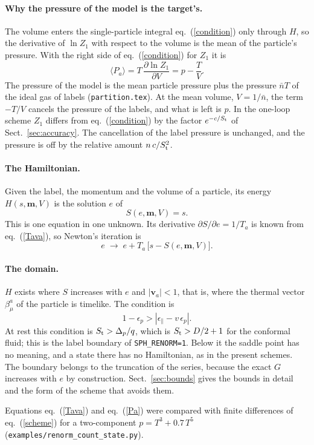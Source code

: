 \documentclass[11pt,aps,preprint,nofootinbib,superscriptaddress,tightenlines]{revtex4-2}
\newcommand{\avg}[1]{\langle #1\rangle}
\def\st{\begin{equation}}
\def\stp{\end{equation}}
\def\Eq#1{eq.~(\ref{#1})}
\def\Sect#1{Sect.~\ref{#1}}
\let\oldparagraph\paragraph
\renewcommand{\paragraph}{\par\bigskip\oldparagraph}
\begin{document}
\paragraph{Why the pressure of the model is the target's.}  The volume enters the single-particle integral \Eq{condition} only through $H$, so the
derivative of $\ln Z_1$ with respect to the volume is the mean of the particle's pressure.  With the right side of \Eq{condition} for $Z_1$ it is
\st
\avg{P_a}=T\,\frac{\partial\ln Z_1}{\partial V}=p-\frac TV .
\stp
The pressure of the model is the mean particle pressure plus the pressure $\bar nT$ of the ideal gas of
labels (\nolinkurl{partition.tex}).  At the mean volume, $V=1/\bar n$, the term $-T/V$ cancels the pressure of the labels, and what is left is $p$.  In
the one-loop scheme $Z_1$ differs from \Eq{condition} by the factor $e^{-c/S_{\rm t}}$ of \Sect{sec:accuracy}.  The cancellation of the label pressure
is unchanged, and the pressure is off by the relative amount $n\,c/S_{\rm t}^2$.

\paragraph{The Hamiltonian.}  Given the label, the momentum and the volume of a particle, its energy $H(s,\bm m,V)$ is the solution $e$ of
\st
S(e,\bm m,V)=s .
\label{root}
\stp
This is one equation in one unknown.  Its derivative $\partial S/\partial e=1/T_a$ is known from \Eq{Tava}, so Newton's iteration is
\st
e\;\to\;e+T_a\,\big[s-S(e,\bm m,V)\big] .
\label{newton}
\stp

\paragraph{The domain.}  $H$ exists where $S$ increases with $e$ and $|\bm v_a|<1$, that is, where the thermal vector $\beta^a_\mu$ of the particle is
timelike.  The condition is
\st
1-\epsilon_p>|\epsilon_\parallel-v\,\epsilon_p| .
\stp
At rest this condition is $S_{\rm t}>\Delta_p/q$, which is $S_{\rm t}>D/2+1$ for the conformal fluid; this is the label boundary of
\texttt{SPH\_RENORM=1}.  Below it the saddle point has no meaning, and a state there has no Hamiltonian, as in the present schemes.  The boundary
belongs to the truncation of the series, because the exact $G$ increases with $e$ by construction.  \Sect{sec:bounds} gives the bounds in detail
and the form of the scheme that avoids them.

Equations \Eq{Tava} and \Eq{Pa} were compared with finite differences of \Eq{scheme} for a two-component $p=T^3+0.7\,T^5$
(\nolinkurl{examples/renorm_count_state.py}).
\end{document}
